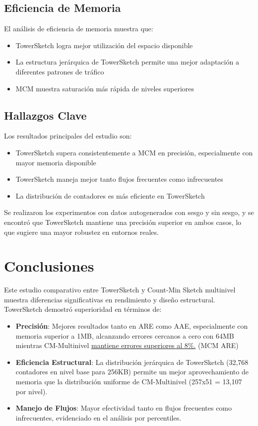 \documentclass[a4paper,12pt]{article}
\begin{document}
\subsection{Eficiencia de Memoria}
El análisis de eficiencia de memoria muestra que:

\begin{itemize}
    \item TowerSketch logra mejor utilización del espacio disponible
    \item La estructura jerárquica de TowerSketch permite una mejor adaptación a diferentes patrones de tráfico
    \item MCM muestra saturación más rápida de niveles superiores
\end{itemize}

\subsection{Hallazgos Clave}
Los resultados principales del estudio son:

\begin{itemize}
    \item TowerSketch supera consistentemente a MCM en precisión, especialmente con mayor memoria disponible
    \item TowerSketch maneja mejor tanto flujos frecuentes como infrecuentes
    \item La distribución de contadores es más eficiente en TowerSketch
\end{itemize}

\noindent Se realizaron los experimentos con datos autogenerados con sesgo y sin sesgo, y se encontró que TowerSketch mantiene una precisión superior en ambos casos, lo que sugiere una mayor robustez en entornos reales.

\newpage
\section{Conclusiones}

\noindent Este estudio comparativo entre TowerSketch y Count-Min Sketch multinivel muestra diferencias significativas en rendimiento y diseño estructural. TowerSketch demostró superioridad en términos de:

\begin{itemize}
    \item \textbf{Precisión}: Mejores resultados tanto en ARE como AAE, especialmente con memoria superior a 1MB, alcanzando errores cercanos a cero con 64MB mientras CM-Multinivel \underline{mantiene errores superiores al 8\%.} (MCM ARE)
    
    \item \textbf{Eficiencia Estructural}: La distribución jerárquica de TowerSketch (32,768 contadores en nivel base para 256KB) permite un mejor aprovechamiento de memoria que la distribución uniforme de CM-Multinivel (257x51 = 13,107 por nivel).
    
    \item \textbf{Manejo de Flujos}: Mayor efectividad tanto en flujos frecuentes como infrecuentes, evidenciado en el análisis por percentiles.
\end{itemize}
\end{document}
